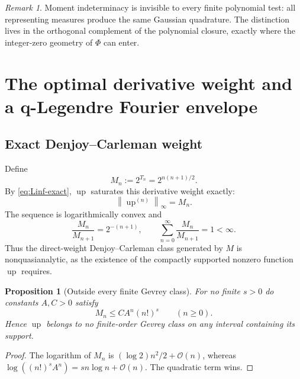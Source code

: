 \documentclass[11pt,oneside]{article}
\numberwithin{equation}{section}
\theoremstyle{plain}
\newtheorem{proposition}[theorem]{Proposition}
\theoremstyle{definition}
\theoremstyle{remark}
\newtheorem{remark}[theorem]{Remark}
\newcommand{\Up}{\operatorname{up}}
\newcommand{\bigO}{\mathcal O}
\newcommand{\norm}[1]{\left\lVert#1\right\rVert}
\begin{document}
\begin{remark}
Moment indeterminacy is invisible to every finite polynomial test: all representing measures
produce the same Gaussian quadrature.  The distinction lives in the orthogonal complement of
the polynomial closure, exactly where the integer-zero geometry of $\Phi$ can enter.
\end{remark}

\section{The optimal derivative weight and a q-Legendre Fourier envelope}
\label{sec:carleman}

\subsection{Exact Denjoy--Carleman weight}

Define
\begin{equation}
 M_n:=2^{T_n}=2^{n(n+1)/2}.
 \label{eq:Mn}
\end{equation}
By \eqref{eq:Linf-exact}, $\Up$ saturates this derivative weight exactly:
\begin{equation}
 \norm{\Up^{(n)}}_\infty=M_n.
 \label{eq:saturates-Mn}
\end{equation}
The sequence is logarithmically convex and
\begin{equation}
 \frac{M_n}{M_{n+1}}=2^{-(n+1)},
 \qquad
 \sum_{n=0}^{\infty}\frac{M_n}{M_{n+1}}=1<\infty.
 \label{eq:nonquasianalytic-sum}
\end{equation}
Thus the direct-weight Denjoy--Carleman class generated by $M$ is nonquasianalytic, as the
existence of the compactly supported nonzero function $\Up$ requires.

\begin{proposition}[Outside every finite Gevrey class]
\label{prop:not-Gevrey}
For no finite $s>0$ do constants $A,C>0$ satisfy
\begin{equation}
 M_n\leq CA^n(n!)^s\qquad(n\geq0).
 \label{eq:no-Gevrey-bound}
\end{equation}
Hence $\Up$ belongs to no finite-order Gevrey class on any interval containing its support.
\end{proposition}

\begin{proof}
The logarithm of $M_n$ is $(\log2)n^2/2+\bigO(n)$, whereas
$\log((n!)^sA^n)=sn\log n+\bigO(n)$.  The quadratic term wins.
\end{proof}
\end{document}
